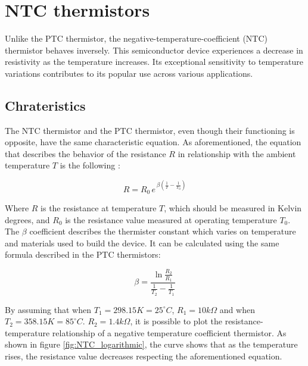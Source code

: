 \vspace{30px}\section{NTC thermistors}
Unlike the PTC thermistor, the negative-temperature-coefficient (NTC) thermistor behaves inversely. This semiconductor device experiences a decrease in resistivity as the temperature increases. Its exceptional sensitivity to temperature variations contributes to its popular use across various applications.



\subsection{Chrateristics}
The NTC thermistor and the PTC thermistor, even though their functioning is opposite, have the same characteristic equation. As aforementioned, the equation that describes the behavior of the resistance $R$ in relationship with the ambient temperature $T$ is the following \cite{Chen20091103}:

\begin{equation*}
    R = R_0 \, e^{\, \beta\left( \frac{1}{T} - \frac{1}{T_0}\right)}
\end{equation*}

\noindent Where $R$ is the resistance at temperature $T$, which should be measured in Kelvin degrees, and $R_0$ is the resistance value measured at operating temperature $T_0$. The $\beta$ coefficient describes the thermister constant which varies on temperature and materials used to build the device. It can be calculated using the same formula described in the PTC thermistors:

\begin{equation*}
    \beta = \frac{\ln{\frac{R_2}{R_1}}}{\frac{1}{T_2} - \frac{1}{T_1}}
\end{equation*}

\noindent By assuming that when $T_1 = 298.15 K = 25^\circ C$, $R_1 = 10k\Omega$ and when $T_2 = 358.15 K = 85^\circ C$. $R_2 = 1.4k\Omega$, it is possible to plot the resistance-temperature relationship of a negative temperature coefficient thermistor. As shown in figure \ref{fig:NTC_logarithmic}, the curve shows that as the temperature rises, the resistance value decreases respecting the aforementioned equation.

